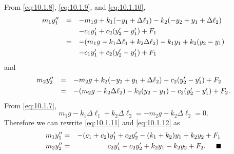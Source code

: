 \begin{examplesolution}
From \eqref{eq:10.1.8}, \eqref{eq:10.1.9}, and \eqref{eq:10.1.10},
\begin{equation}
  \label{eq:10.1.11}
  \begin{array}{ccl}
    m_{1}y_{1}'' & =       & -m_{1}g+k_{1}(-y_{1}+\Delta\ell_{1})-k_{2}(-y_{2}+y_{1}+\Delta\ell_{2})         \\[1\jot]
                 & \mbox{} & -c_{1}y_{1}'+c_{2}(y_{2}'-y_{1}')+F_{1}                                         \\[1\jot]
                 & =       & -(m_{1}g-k_{1}\Delta\ell_{1}+k_{2}\Delta\ell_{2})-k_{1}y_{1}+k_{2}(y_{2}-y_{1}) \\[1\jot]
                 & \mbox{} & -c_{1}y_{1}'+c_{2}(y_{2}'-y_{1}')+F_{1}
  \end{array}
\end{equation}
and
\begin{equation}
  \label{eq:10.1.12}
  \begin{array}{ccl}
    m_{2}y_{2}'' & = & -m_{2}g+k_{2}(-y_{2}+y_{1}+\Delta\ell_{2})-c_{2}(y_{2}'-y_{1}')+F_{2}        \\[1\jot]
                 & = & -(m_{2}g-k_{2}\Delta\ell_{2})-k_{2}(y_{2}-y_{1})-c_{2}(y_{2}'-y_{1}')+F_{2}.
  \end{array}
\end{equation}
From \eqref{eq:10.1.7},
\[
  m_{1}g-k_{1}\Delta\ell_{1}+k_{2}\Delta\ell_{2}=-m_{2}g+k_{2}\Delta\ell_{2}=0.
\]
Therefore we can rewrite \eqref{eq:10.1.11} and \eqref{eq:10.1.12} as
\begin{eqnarray*}
  m_{1}y_{1}'' & = & -(c_{1}+c_{2})y_{1}'+c_{2}y_{2}'-(k_{1}+k_{2})y_{1}+k_{2}y_{2}+F_{1} \\
  m_{2}y_{2}'' & = & c_{2}y_{1}'-c_{2}y_{2}'+k_{2}y_{1}-k_{2}y_{2}+F_{2}.\quad\bbox
\end{eqnarray*}
\end{examplesolution}

